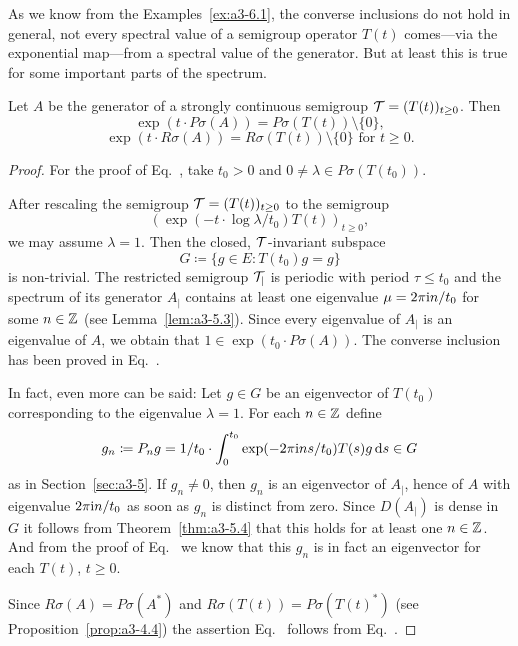 As we know from the Examples~\ref{ex:a3-6.1}, the converse inclusions do not hold in general, \ie not every spectral value of a semigroup operator $T(t)$ comes---via the exponential map---from a spectral value of the generator.
But at least this is true for some important parts of the spectrum.
\begin{theorem}\label{thm:a3-6.3}%
Let $A$ be the generator of a strongly continuous semigroup $\TT = (T(t))_{t \geq 0}$.
Then
\begin{equation}\label{eq:a3-6.4}
\exp(t \cdot P\sigma(A)) = P\sigma(T(t)) \setminus \{0\} ,
\end{equation}
\begin{equation}\label{eq:a3-6.5}
\exp(t \cdot R\sigma(A)) = R\sigma(T(t)) \setminus \{0\} \text{ for } t \geq 0 .
\end{equation}
\end{theorem}
\begin{proof}
For the proof of Eq.~,  take $t_{0} > 0$ and $0 \neq \lambda \in P\sigma(T(t_{0}))$.

After rescaling the semigroup $\TT = (T(t))_{t \geq 0}$ to the semigroup
\[
(\exp(-t \cdot \log\lambda/t_{0})T(t))_{t \geq 0} ,
\]
we may assume $\lambda = 1$. 
Then the closed, $\mathcal{T}$-invariant subspace
\[
G \coloneq \{g \in E \colon T(t_{0})g = g\}
\]
is non-trivial.
The restricted semigroup $\mathcal{T}_{|}$ is periodic with period $\tau \leq t_{0}$ and the spectrum of its generator $A_{|}$ contains at least one eigenvalue $\mu = 2\pi\mathrm{i} n/t_{0}$ for some $n \in \mathbb{Z}$ (see Lemma~\ref{lem:a3-5.3}).
Since every eigenvalue of\/ $A_{|}$ is an eigenvalue of\/ $A$, we obtain that $1 \in \exp(t_{0} \cdot P\sigma(A))$.
The converse inclusion has been proved in Eq.~.

In fact, even more can be said: Let $g \in G$ be an eigenvector of\/ $T(t_{0})$ corresponding to the eigenvalue $\lambda = 1$.
For each $n \in \mathbb{Z}$ define
\[
g_{n} \coloneq P_{n}g = 1/t_{0} \cdot \int_{0}^{t_{0}} \exp(-2\pi\mathrm{i} ns/t_{0})T(s)g  \mathop{}\!\mathrm{d}{s} \in G
\]
as in Section~\ref{sec:a3-5}.
If\/ $g_{n} \ne 0$, then $g_{n}$ is an eigenvector of\/ $A_{|}$, hence of\/ $A$ with eigenvalue $2\pi\mathrm{i} n/t_{0}$ as soon as $g_{n}$ is distinct from zero.
Since $D(A_{|})$ is dense in $G$ it follows from Theorem~\ref{thm:a3-5.4} that this holds for at least one $n \in \mathbb{Z}$.
And from the proof of Eq.~ we know that this $g_{n}$ is in fact an eigenvector for each $T(t)$, $t \geq 0$.

Since $R\sigma(A) = P\sigma(A^{*})$ and $R\sigma(T(t)) = P\sigma(T(t)^{*})$ (see Proposition~\ref{prop:a3-4.4}) the assertion Eq.~  follows from Eq.~.
\end{proof}
